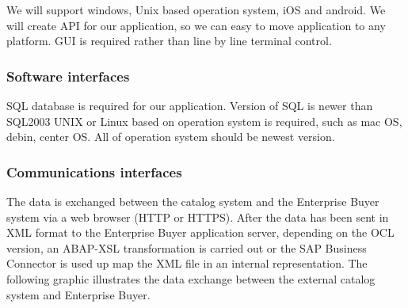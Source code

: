 We will support windows, Unix based operation  system, iOS and android.
We will create API for our application, so we can easy to move application to any platform.
GUI is required rather than line by line terminal control.

\subsubsection{Software interfaces}

SQL database is required for our application.
Version of SQL is newer than SQL2003
UNIX or Linux based on operation system is required, such as mac OS, debin, center OS.
All of operation system should be newest version.


\subsubsection{Communications interfaces}

The data is exchanged between the catalog system and the Enterprise Buyer system via a web browser (HTTP or HTTPS).
After the data has been sent in XML format to the Enterprise Buyer application server, depending on the OCL version, 
an ABAP-XSL transformation is carried out or the SAP Business Connector is used up map the XML file in an internal representation.
The following graphic illustrates the data exchange between the external catalog system and Enterprise Buyer.

